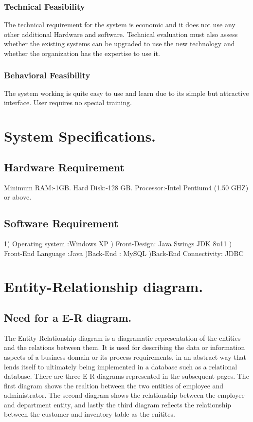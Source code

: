 \documentclass[12pt,a4paper]{report}
\begin{document}
\subsection{Technical Feasibility}
The technical requirement for the system is economic and it does not use any other additional Hardware and software. Technical evaluation must also assess whether the existing systems can be upgraded to use the new technology and whether the organization has the expertise to use it. 
\subsection{Behavioral Feasibility}
The system working is quite easy to use and learn due to its simple but attractive interface. User requires no special training.

\chapter{System Specifications.}

\section{Hardware Requirement}
Minimum RAM:-1GB.
\newline Hard Disk:-128 GB.
\newline Processor:-Intel Pentium4 (1.50 GHZ) or above.

\section{Software Requirement}
1) Operating system :Windows XP
) Front-Design: Java Swings JDK 8u11
) Front-End Language :Java
)Back-End : MySQL
)Back-End Connectivity: JDBC

\chapter{Entity-Relationship diagram.}%

\section{Need for a E-R diagram.}
The Entity Relationship diagram is a diagramatic representation of the entities and the relations between them. It is used for describing the data or information aspects of a business domain or its process requirements, in an abstract way that lends itself to ultimately being implemented in a database such as a relational database. There are three E-R diagrams represented in the subsequent pages. The first diagram shows the realtion between the two entities of employee and administrator. The second diagram shows the relationship between the employee and department entity, and lastly the third diagram reflects the relationship between the customer and inventory table as the enitites.
\end{document}
